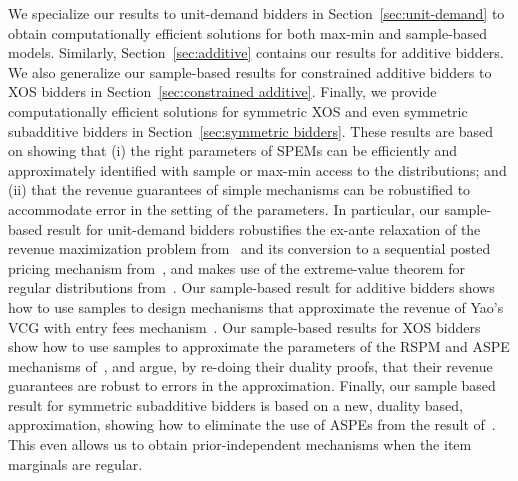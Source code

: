 We specialize our results to unit-demand bidders in Section~\ref{sec:unit-demand} to obtain computationally efficient solutions for both max-min and sample-based models. Similarly, Section~\ref{sec:additive} contains our results for additive bidders. %
 We also generalize our sample-based results for constrained additive bidders to XOS bidders in Section~\ref{sec:constrained additive}.  %
 Finally, we provide computationally efficient solutions for symmetric XOS and even symmetric subadditive bidders in Section~\ref{sec:symmetric bidders}.
 These results are based on showing that (i) the right parameters of SPEMs can be efficiently and approximately identified with sample  or max-min access to the distributions; and (ii) that the revenue guarantees of simple mechanisms can be robustified to accommodate error in the setting of the parameters. In particular, our sample-based result for unit-demand bidders robustifies the ex-ante relaxation of the revenue maximization problem from~\cite{Alaei11} and its conversion to a sequential posted pricing mechanism from~\cite{ChawlaHMS10}, and makes use of the extreme-value theorem for regular distributions from~\cite{CaiD11b}. Our sample-based result for additive bidders shows how to use samples to design mechanisms that approximate the revenue of Yao's VCG with entry fees mechanism~\cite{Yao15}. Our sample-based results for  XOS bidders show how to use samples to approximate the parameters of the RSPM and ASPE mechanisms of~\cite{CaiZ17}, and argue, by re-doing their duality proofs, that their revenue guarantees are robust to errors in the approximation. Finally, our sample based result for symmetric subadditive bidders is based on a new, duality based, approximation, showing how to eliminate the use of ASPEs from the result of~\cite{CaiZ17}. This even allows us to obtain prior-independent mechanisms when the item marginals are regular.









